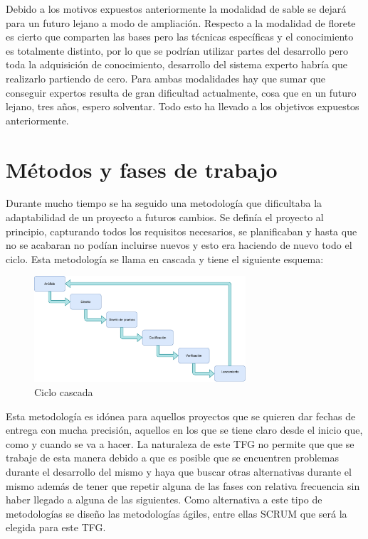 \documentclass[11pt,a4paper,twoside,final]{article}
\begin{document}
\bigskip
Debido a los motivos expuestos anteriormente la modalidad de sable se dejará para un futuro lejano a modo de ampliación. Respecto a la modalidad de florete es cierto que comparten las bases pero las técnicas específicas y el conocimiento es totalmente distinto, por lo que se podrían utilizar partes del desarrollo pero toda la adquisición de conocimiento, desarrollo del sistema experto habría que realizarlo partiendo de cero. Para ambas modalidades hay que sumar que conseguir expertos resulta de gran dificultad actualmente, cosa que en un futuro lejano, tres años, espero solventar. Todo esto ha llevado a los objetivos expuestos anteriormente.


\newpage

\section{Métodos y fases de trabajo}

Durante mucho tiempo se ha seguido una metodología que dificultaba la adaptabilidad de un proyecto a futuros cambios. Se definía el proyecto al principio, capturando todos los requisitos necesarios, se planificaban y hasta que no se acabaran no podían incluirse nuevos y esto era haciendo de nuevo todo el ciclo. Esta metodología se llama en cascada y tiene el siguiente esquema:

\begin{figure}[H]
  \centering
   \includegraphics[width=0.7\textwidth]{Cascada.pdf}
   \caption{Ciclo cascada}
  \label{Ciclo cascada}
\end{figure}

Esta metodología es idónea para aquellos proyectos que se quieren dar fechas de entrega con mucha precisión, aquellos en los que se tiene claro desde el inicio que, como y cuando se va a hacer. La naturaleza de este TFG no permite que que se trabaje de esta manera debido a que es posible que se encuentren problemas durante el desarrollo del mismo y haya que buscar otras alternativas durante el mismo además de tener que repetir alguna de las fases con relativa frecuencia sin haber llegado a alguna de las siguientes. Como alternativa a este tipo de metodologías se diseño las metodologías ágiles, entre ellas SCRUM \cite{scrum} que será la elegida para este TFG.
\end{document}
